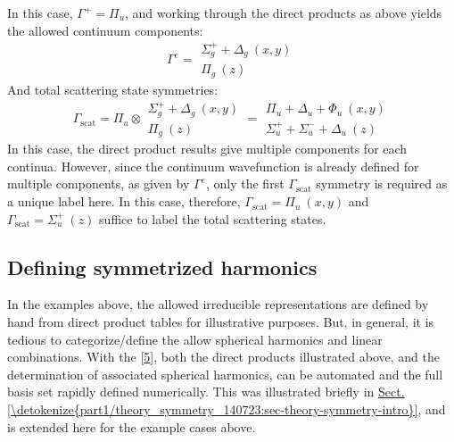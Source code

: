 \documentclass[letterpaper,table,10pt,english]{jupyterBook}
\begin{document}
\sphinxAtStartPar
In this case, \(\Gamma^{+} = \Pi_u\), and \sphinxhyphen{} working through the direct products as above \sphinxhyphen{} yields the allowed continuum components:
\label{equation:part2/sym-fitting-intro_240723:a91d5d7a-ccd2-4530-a7de-809feed07790}\begin{equation}
\Gamma^{e}=\begin{array}{c}
\Sigma_{g}^{+} + \Delta_{g}~(x,y)\\
\Pi_{g}~(z)
\end{array}
\end{equation}
\sphinxAtStartPar
And total scattering state symmetries:
\label{equation:part2/sym-fitting-intro_240723:364335ec-0546-42c3-92ce-a2900df9b057}\begin{equation}
\Gamma_{\mathrm{scat}}=\Pi_{u}\otimes\begin{array}{c}
\Sigma_{g}^{+} + \Delta_{g}~(x,y)\\
\Pi_{g}~(z)
\end{array}=\begin{array}{c}
\Pi_{u} + \Delta_{u} + \Phi_{u}~(x,y)\\
\Sigma_{u}^{+} + \Sigma_{u}^{-} + \Delta_{u}~(z)
\end{array}
\end{equation}
\sphinxAtStartPar
In this case, the direct product results give multiple components for each continua. However, since the continuum wavefunction is already defined for multiple components, as given by \(\Gamma^{e}\), only the first \(\Gamma_{\mathrm{scat}}\) symmetry is required as a unique label here. In this case, therefore, \(\Gamma_{\mathrm{scat}} = \Pi_{u}~(x,y)\) and \(\Gamma_{\mathrm{scat}} =\Sigma_{u}^{+}~(z)\) suffice to label the total scattering states.


\subsection{Defining symmetrized harmonics}
\label{\detokenize{part2/sym-fitting-intro_240723:defining-symmetrized-harmonics}}
\sphinxAtStartPar
In the examples above, the allowed irreducible representations are defined by hand from direct product tables for illustrative purposes. But, in general, it is tedious to categorize/define the allow spherical harmonics and linear combinations. With the  {[}\hyperlink{cite.backmatter/bibliography:id681}{5}{]}, both the direct products illustrated above, and the determination of associated spherical harmonics, can be automated and the full basis set rapidly defined numerically. This was illustrated briefly in \hyperref[\detokenize{part1/theory_symmetry_140723:sec-theory-symmetry-intro}]{Sect.\@ \ref{\detokenize{part1/theory_symmetry_140723:sec-theory-symmetry-intro}}}, and is extended here for the example cases above.
\end{document}
